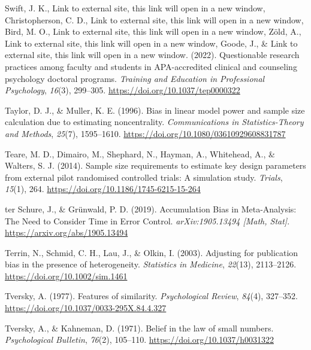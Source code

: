 \documentclass[
  letterpaper,
  DIV=11,
  numbers=noendperiod]{scrreprt}
\newlength{\cslhangindent}
\newlength{\cslentryspacingunit} %
\newenvironment{CSLReferences}[2] %
 {%
  \setlength{\parindent}{0pt}
  \ifodd #1
  \let\oldpar\par
  \def\par{\hangindent=\cslhangindent\oldpar}
  \fi
  \setlength{\parskip}{#2\cslentryspacingunit}
 }%
 {}
\begin{document}
\begin{CSLReferences}{1}{0}
\leavevmode{}%
Swift, J. K., Link to external site, this link will open in a new
window, Christopherson, C. D., Link to external site, this link will
open in a new window, Bird, M. O., Link to external site, this link will
open in a new window, Zöld, A., Link to external site, this link will
open in a new window, Goode, J., \& Link to external site, this link
will open in a new window. (2022). Questionable research practices among
faculty and students in {APA-accredited} clinical and counseling
psychology doctoral programs. \emph{Training and Education in
Professional Psychology}, \emph{16}(3), 299--305.
\url{https://doi.org/10.1037/tep0000322}

\leavevmode{}%
Taylor, D. J., \& Muller, K. E. (1996). Bias in linear model power and
sample size calculation due to estimating noncentrality.
\emph{Communications in Statistics-Theory and Methods}, \emph{25}(7),
1595--1610. \url{https://doi.org/10.1080/03610929608831787}

\leavevmode{}%
Teare, M. D., Dimairo, M., Shephard, N., Hayman, A., Whitehead, A., \&
Walters, S. J. (2014). Sample size requirements to estimate key design
parameters from external pilot randomised controlled trials: A
simulation study. \emph{Trials}, \emph{15}(1), 264.
\url{https://doi.org/10.1186/1745-6215-15-264}

\leavevmode{}%
ter Schure, J., \& Grünwald, P. D. (2019). Accumulation {Bias} in
{Meta-Analysis}: {The Need} to {Consider Time} in {Error Control}.
\emph{arXiv:1905.13494 {[}Math, Stat{]}}.
\url{https://arxiv.org/abs/1905.13494}

\leavevmode{}%
Terrin, N., Schmid, C. H., Lau, J., \& Olkin, I. (2003). Adjusting for
publication bias in the presence of heterogeneity. \emph{Statistics in
Medicine}, \emph{22}(13), 2113--2126.
\url{https://doi.org/10.1002/sim.1461}

\leavevmode{}%
Tversky, A. (1977). Features of similarity. \emph{Psychological Review},
\emph{84}(4), 327--352. \url{https://doi.org/10.1037/0033-295X.84.4.327}

\leavevmode{}%
Tversky, A., \& Kahneman, D. (1971). Belief in the law of small numbers.
\emph{Psychological Bulletin}, \emph{76}(2), 105--110.
\url{https://doi.org/10.1037/h0031322}


\end{CSLReferences}
\end{document}
